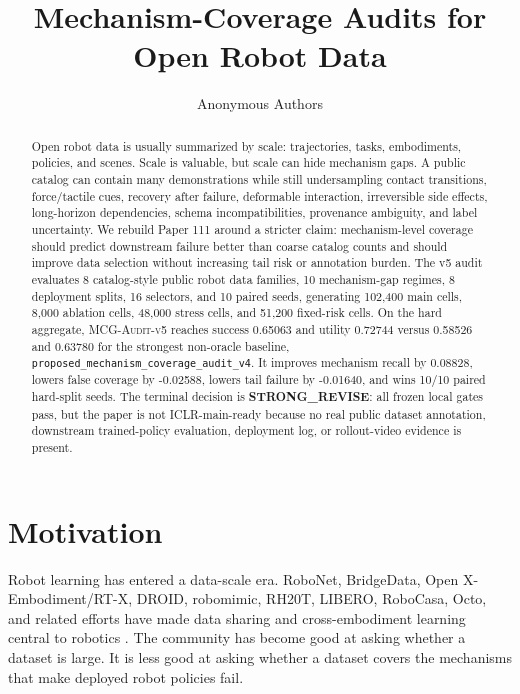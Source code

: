 \documentclass{article}
\title{Mechanism-Coverage Audits for Open Robot Data}
\author{Anonymous Authors}
\newcommand{\method}{\textsc{MCG-Audit-v5}}
\begin{document}
\maketitle

\begin{abstract}
Open robot data is usually summarized by scale: trajectories, tasks, embodiments, policies, and scenes. Scale is valuable, but scale can hide mechanism gaps. A public catalog can contain many demonstrations while still undersampling contact transitions, force/tactile cues, recovery after failure, deformable interaction, irreversible side effects, long-horizon dependencies, schema incompatibilities, provenance ambiguity, and label uncertainty. We rebuild Paper 111 around a stricter claim: mechanism-level coverage should predict downstream failure better than coarse catalog counts and should improve data selection without increasing tail risk or annotation burden. The v5 audit evaluates 8 catalog-style public robot data families, 10 mechanism-gap regimes, 8 deployment splits, 16 selectors, and 10 paired seeds, generating 102,400 main cells, 8,000 ablation cells, 48,000 stress cells, and 51,200 fixed-risk cells. On the hard aggregate, \method{} reaches success 0.65063 and utility 0.72744 versus 0.58526 and 0.63780 for the strongest non-oracle baseline, \texttt{proposed\_mechanism\_coverage\_audit\_v4}. It improves mechanism recall by 0.08828, lowers false coverage by -0.02588, lowers tail failure by -0.01640, and wins 10/10 paired hard-split seeds. The terminal decision is \textbf{STRONG\_REVISE}: all frozen local gates pass, but the paper is not ICLR-main-ready because no real public dataset annotation, downstream trained-policy evaluation, deployment log, or rollout-video evidence is present.
\end{abstract}

\section{Motivation}
Robot learning has entered a data-scale era. RoboNet, BridgeData, Open X-Embodiment/RT-X, DROID, robomimic, RH20T, LIBERO, RoboCasa, Octo, and related efforts have made data sharing and cross-embodiment learning central to robotics \citep{dasari2019robonet,walke2023bridgedata,openx2023,khazatsky2024droid,mandlekar2021robomimic,fang2023rh20t,liu2023libero,robocasa2024,octo2024}. The community has become good at asking whether a dataset is large. It is less good at asking whether a dataset covers the mechanisms that make deployed robot policies fail.
\end{document}
